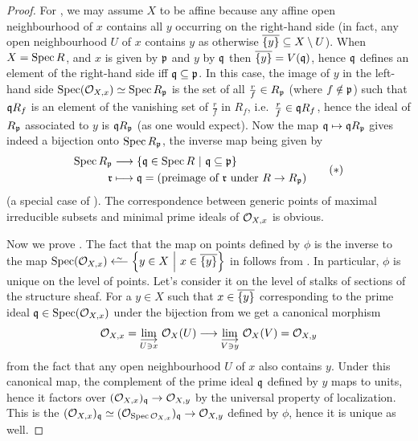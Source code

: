 \documentclass[a4paper,parskip=half,numbers=enddot, DIV=12]{scrreprt}
\begin{document}
\begin{proof}
    For , we may assume $X$ to be affine because any affine open neighbourhood of $x$ contains all $y$ occurring on the right-hand side (in fact, any open neighbourhood $U$ of $x$ contains $y$ as otherwise $\overline{\{y\}}\subseteq X\setminus U$). When $X=\operatorname{Spec} R$, and $x$ is given by $\mathfrak{p}$ and $y$ by $\mathfrak{q}$ then $\overline{\{y\}} = V(\mathfrak{q})$, hence $\mathfrak{q}$ defines an element of the right-hand side iff $\mathfrak{q}\subseteq \mathfrak{p}$. In this case, the image of $y$ in the left-hand side $\operatorname{Spec}(\mathcal{O}_{X,x})\simeq \operatorname{Spec} R_{\mathfrak{p}}$ is the set of all $\frac{r}{f}\in R_{\mathfrak{p}}$ (where $f\notin\mathfrak{p}$) such that $\mathfrak{q} R_f$ is an element of the vanishing set of $\frac{r}{f}$ in $R_f$, i.e.\ $\frac{r}{f}\in \mathfrak{q} R_f$, hence the ideal of $R_{\mathfrak{p}}$ associated to $y$ is $\mathfrak{q} R_{\mathfrak{p}}$ (as one would expect). Now the map $\mathfrak{q}\mapsto\mathfrak{q} R_{\mathfrak{p}}$ gives indeed a bijection onto $\operatorname{Spec} R_{\mathfrak{p}}$, the inverse map being given by 
    \begin{align}\lbl{eq:localizationBijection}
    	\begin{split}
	    	\Spec R_\pp &\morphism \left\{\qq\in\Spec R\st\qq\subseteq\pp\right\}\\ \rr&\longmapsto \qq= (\text{preimage of }\rr\text{ under }R\to R_\pp)
    	\end{split}\tag{$*$}
    \end{align}
    (a special case of \cite[Corollary~2.3.1]{alg1}). The correspondence between generic points of maximal irreducible subsets and minimal prime ideals of $\mathcal{O}_{X,x}$ is obvious.
    
    Now we prove . The fact that the map on points defined by $\phi$ is the inverse to the map $\Spec(\Oo_{X,x}) \lisomorphism \left\{y\in X\st x\in \ov{\{y\}}\right\}$ in  follows from . In particular, $\phi$ is unique on the level of points. Let's consider it on the level of stalks of sections of the structure sheaf. For a $y\in X$ such that $x\in\overline{\{y\}}$ corresponding to the prime ideal $\mathfrak{q}\in\operatorname{Spec}(\mathcal{O}_{X,x})$ under the bijection from  we get a canonical morphism
    \begin{align*}
        \Oo_{X,x} = \colimit[U\ni x] \Oo_X(U) \morphism \colimit[V\ni y] \Oo_X(V)=\Oo_{X,y}
    \end{align*}
    from the fact that any open neighbourhood $U$ of $x$ also contains $y$. Under this canonical map, the complement of the prime ideal $\mathfrak{q}$ defined by $y$ maps to units, hence it factors over $(\Oo_{X,x})_\qq\morphism \Oo_{X,y}$ by the universal property of localization. This is the $(\Oo_{X,x})_\qq \simeq (\Oo_{\Spec \Oo_{X,x}})_\qq \morphism \Oo_{X,y}$ defined by $\phi$, hence it is unique as well.
\end{proof}
\end{document}
